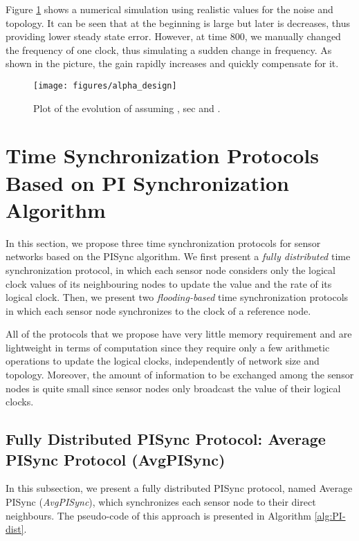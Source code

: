 \documentclass[english,a4paper,10pt,final]{article}
\numberwithin{equation}{section}
\numberwithin{figure}{section}
\begin{document}
Figure \ref{fig:alpha_design} shows a numerical simulation using realistic values for the noise and topology. It can be seen that at the beginning  is large but later is decreases, thus providing lower steady state error. However, at time 800, we manually changed the frequency of one clock, thus simulating a sudden change in frequency. As shown in the picture, the gain  rapidly increases and quickly compensate for it.

\begin{figure} 
\center

\texttt{[image: figures/alpha\_design]} 

\caption{\label{fig:alpha_design} Plot of the evolution of  assuming , sec and .}
\end{figure}

\section{Time Synchronization Protocols Based on PI Synchronization Algorithm}
\label{sec:Protocols}

In this section, we propose three time synchronization protocols for sensor networks based on the PISync algorithm. We first present a \textit{fully distributed} time synchronization protocol, in which each sensor node considers only the logical clock values of its neighbouring nodes to update the value and the rate of its logical clock. 
 Then, we present two \textit{flooding-based} time synchronization protocols in which each sensor node synchronizes to the clock of a reference node.

All of the protocols that we propose have very little memory requirement and are lightweight in terms of computation since they require only a few arithmetic operations to update the logical clocks, independently of network size and topology. Moreover, the amount of information to be exchanged among the sensor nodes is quite small since sensor nodes only broadcast the value of their logical clocks.

\subsection{Fully Distributed PISync Protocol: Average PISync Protocol (AvgPISync)}

In this subsection, we present a fully distributed PISync protocol, named Average PISync (\textit{AvgPISync}), which synchronizes each sensor node to their direct neighbours. The pseudo-code of this approach is presented in Algorithm \ref{alg:PI-dist}.
\end{document}
